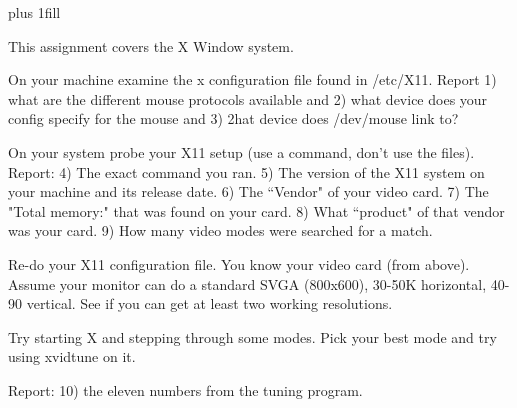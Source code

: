 
\rightskip=0pt plus 1fill

\parindent 0pt

This assignment covers the X Window system.

On your machine examine the x configuration file found in {\ltt{}/etc/X11}.
Report 1) what are the different mouse protocols available and 
2) what device does your config specify for the mouse and
3) 2hat device does {\ltt{}/dev/mouse} link to?

On your system probe your X11 setup (use a command, don't use
the files).
Report:
4) The exact command you ran.
5) The version of the X11 system on your machine and its release date.
6) The ``Vendor" of your video card.
7) The "Total memory:" that was found on your card.
8) What ``product" of that vendor was your card.
9) How many video modes were searched for a match.

Re-do your X11 configuration file.
You know your video card (from above).
Assume your monitor can do a standard SVGA (800x600), 30-50K horizontal,
40-90 vertical.
See if you can get at least two working resolutions.

Try starting X and stepping through some modes. Pick your
best mode and try using {\ltt{}xvidtune} on it.

Report: 10) the eleven numbers from the tuning program.

\bye
